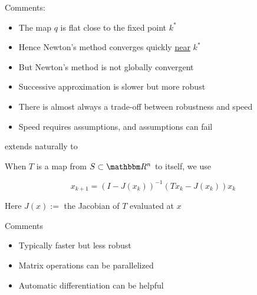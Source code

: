 \begin{frame}
    
    Comments:
    \begin{itemize}
        \item The map $q$ is flat close to the fixed point $k^*$
            \vspace{0.5em}
        \item Hence Newton's method converges quickly \underline{near} $k^*$
            \vspace{0.5em}
        \item But Newton's method is not globally convergent
            \vspace{0.5em}
        \item Successive approximation is slower but more robust
    \end{itemize}


    \begin{itemize}
        \item There is almost always a trade-off between robustness and speed
            \vspace{0.5em}
        \item Speed requires assumptions, and assumptions can fail
    \end{itemize}


\end{frame}


\begin{frame}
    
     extends naturally to 

            \vspace{0.5em}
    When $T$ is a map from $S \subset \RR^n$ to itself, we use

    \begin{equation*}
        x_{k+1} = (I - J(x_k))^{-1} 
                    (Tx_k - J(x_k)) x_k
    \end{equation*}

    Here $J(x) := $ the Jacobian of $T$ evaluated at $x$

    \vspace{1em}

    Comments
    \begin{itemize}
        \item Typically faster but less robust
            \vspace{0.5em}
        \item Matrix operations can be parallelized
            \vspace{0.5em}
        \item Automatic differentiation can be helpful
    \end{itemize}



\end{frame}



